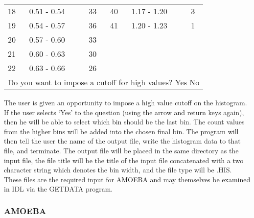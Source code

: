 \begin{center}
\begin{tabular}{||l l l|l l l||}
             18 &  0.51 - 0.54  &   33 &  40 &  1.17 - 1.20  &    3 \\
             19 &  0.54 - 0.57  &   36 &  41 &  1.20 - 1.23  &    1 \\
             20 &  0.57 - 0.60  &   33 &     &               &      \\
             21 &  0.60 - 0.63  &   30 &     &               &      \\
             22 &  0.63 - 0.66  &   26 &     &               &      \\
\hline
\multicolumn{6}{||l||}{Do you want to impose a cutoff for high values?   Yes
No} \\ \hline
\end{tabular}
\end{center}

      The user is given an opportunity to impose a high value cutoff on
   the histogram.  If the user selects `Yes' to the question (using the
   arrow and return keys again), then he will be able to select which bin
   should be the last bin.  The count values from the higher bins will be
   added into the chosen final bin.
      The program will then tell the user the name of the output file,
   write the histogram data to that file, and terminate.  The output file
   will be placed in the same directory as the input file, the file title
   will be the title of the input file concatenated with a two character
   string which denotes the bin width, and the file type will be
   .HIS. These files are the required input for AMOEBA and may themselves be
   examined in IDL via the GETDATA program.

\subsubsection{AMOEBA}

